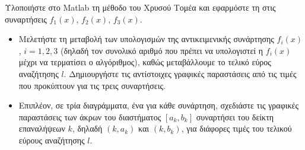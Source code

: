 Υλοποιήστε στο Matlab  τη μέθοδο του Χρυσού Τομέα και 
εφαρμόστε τη στις συναρτήσεις $f_1(x)$, $f_2(x)$, $f_3(x)$.
\begin{itemize}
    \item Μελετήστε τη μεταβολή των υπολογισμών της αντικειμενικής συνάρτησης $f_i(x)$, $i = 1,2,3$
    (δηλαδή τον συνολικό αριθμό που πρέπει να υπολογιστεί η $f_i(x)$ μέχρι να τερματίσει ο
    αλγόριθμος), καθώς μεταβάλλουμε το τελικό εύρος αναζήτησης $l$. Δημιουργήστε τις αντίστοιχες
    γραφικές παραστάσεις από τις τιμές που προκύπτουν για τις τρεις συναρτήσεις.

    \item Επιπλέον, σε τρία διαγράμματα, ένα για κάθε συνάρτηση, σχεδιάστε τις γραφικές παραστάσεις
    των άκρων του διαστήματος $[a_k, b_k]$ συναρτήσει του δείκτη επαναλήψεων $k$, δηλαδή
    $(k, a_k)$ και $(k, b_k)$, για διάφορες τιμές του τελικού εύρους αναζήτησης $l$.
\end{itemize}